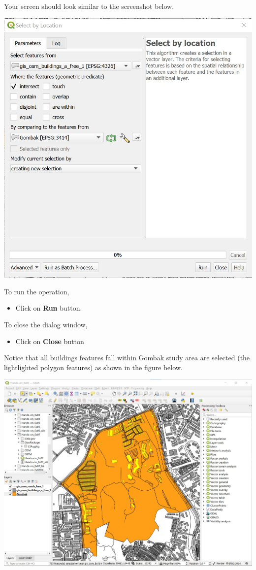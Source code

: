 \documentclass[
  letterpaper,
  DIV=11,
  numbers=noendperiod]{scrreprt}
\providecommand{\tightlist}{%
  \setlength{\itemsep}{0pt}\setlength{\parskip}{0pt}}\usepackage{longtable,booktabs,array}
\begin{document}
Your screen should look similar to the screenshot below.

\includegraphics{./img07/image12.jpg}

To run the operation,

\begin{itemize}
\tightlist
\item
  Click on \textbf{Run} button.
\end{itemize}

To close the dialog window,

\begin{itemize}
\tightlist
\item
  Click on \textbf{Close} button
\end{itemize}

Notice that all buildings features fall within Gombak study area are
selected (the lightlighted polygon features) as shown in the figure
below.

\includegraphics{./img07/image13.jpg}
\end{document}
